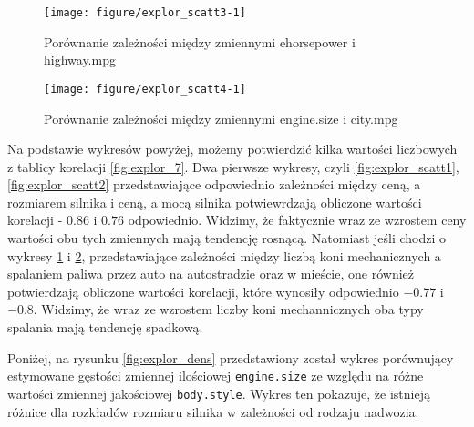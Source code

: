\documentclass[12pt, a4paper]{article}\usepackage[]{graphicx}\usepackage[]{xcolor}
\makeatletter
\def\maxwidth{ %
  \ifdim\Gin@nat@width>\linewidth
    \linewidth
  \else
    \Gin@nat@width
  \fi
}
\newenvironment{knitrout}{}{} %
\makeatother
\begin{document}
\begin{knitrout}
\color{fgcolor}\begin{figure}[H]

{\centering \texttt{[image: figure/explor\_scatt3-1]} 

}

\caption[Porównanie zależności między zmiennymi ehorsepower i highway.mpg]{Porównanie zależności między zmiennymi ehorsepower i highway.mpg}\label{fig:explor_scatt3}
\end{figure}

\end{knitrout}

\begin{knitrout}
\color{fgcolor}\begin{figure}[H]

{\centering \texttt{[image: figure/explor\_scatt4-1]} 

}

\caption[Porównanie zależności między zmiennymi engine.size i city.mpg]{Porównanie zależności między zmiennymi engine.size i city.mpg}\label{fig:explor_scatt4}
\end{figure}

\end{knitrout}

Na podstawie wykresów powyżej, możemy potwierdzić kilka wartości liczbowych z tablicy korelacji \ref{fig:explor_7}. Dwa pierwsze wykresy, czyli \ref{fig:explor_scatt1}, \ref{fig:explor_scatt2} przedstawiające odpowiednio zależności między ceną, a rozmiarem silnika i ceną, a mocą silnika potwiewrdzają obliczone wartości korelacji - $0.86$ i $0.76$ odpowiednio. Widzimy, że faktycznie wraz ze wzrostem ceny wartości obu tych zmiennych mają tendencję rosnącą. Natomiast jeśli chodzi o wykresy \ref{fig:explor_scatt3} i \ref{fig:explor_scatt4}, przedstawiające zależności między liczbą koni mechanicznych a spalaniem paliwa przez auto na autostradzie oraz w mieście, one również potwierdzają obliczone wartości korelacji, które wynosiły odpowiednio $-0.77$ i $-0.8$. Widzimy, że wraz ze wzrostem liczby koni mechannicznych oba typy spalania mają tendencję spadkową.

Poniżej, na rysunku \ref{fig:explor_dens} przedstawiony został wykres porównujący estymowane gęstości zmiennej ilościowej \texttt{engine.size} ze względu na różne wartości zmiennej jakościowej \texttt{body.style}. Wykres ten pokazuje, że istnieją różnice dla rozkładów rozmiaru silnika w zależności od rodzaju nadwozia.
\end{document}
